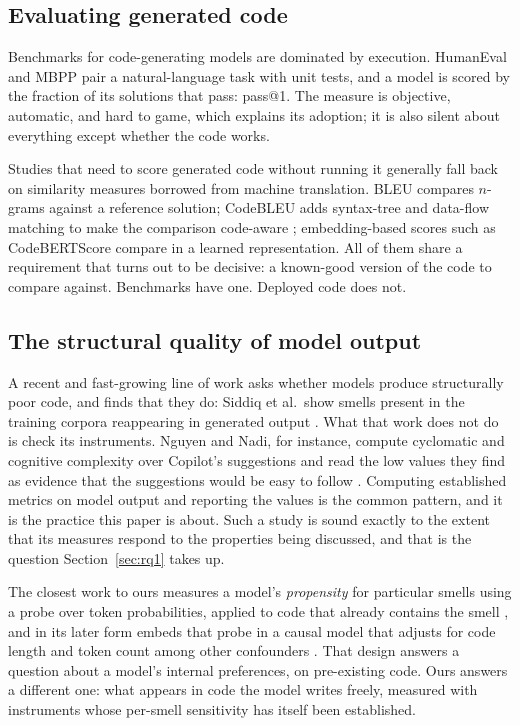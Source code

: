 \documentclass[10pt,a4paper,twocolumn]{article}
\begin{document}
\subsection{Evaluating generated code}

Benchmarks for code-generating models are dominated by execution. HumanEval
\cite{humaneval2021} and MBPP \cite{mbpp2021} pair a natural-language task with
unit tests, and a model is scored by the fraction of its solutions that pass:
pass@1. The measure is objective, automatic, and hard to game, which explains its
adoption; it is also silent about everything except whether the code works.

Studies that need to score generated code without running it generally fall back
on similarity measures borrowed from machine translation. BLEU compares
$n$-grams against a reference solution; CodeBLEU adds syntax-tree and data-flow
matching to make the comparison code-aware \cite{codebleu2020}; embedding-based
scores such as CodeBERTScore compare in a learned representation. All of them
share a requirement that turns out to be decisive: a known-good version of the
code to compare against. Benchmarks have one. Deployed code does not.

\subsection{The structural quality of model output}

A recent and fast-growing line of work asks whether models produce structurally
poor code, and finds that they do: Siddiq et al.\ show smells present in the
training corpora reappearing in generated output \cite{siddiq2022empirical}. What
that work does not do is check its instruments. Nguyen and Nadi, for instance,
compute cyclomatic and cognitive complexity over Copilot's suggestions and read
the low values they find as evidence that the suggestions would be easy to
follow \cite{nguyen2022empirical}. Computing established metrics on model output
and reporting the values is the common pattern, and it is the practice this
paper is about. Such a study is sound exactly to the extent that its measures
respond to the properties being discussed, and that is the question
Section~\ref{sec:rq1} takes up.

The closest work to ours measures a model's \emph{propensity} for particular
smells using a probe over token probabilities, applied to code that already
contains the smell \cite{velasco2024propense}, and in its later form embeds that
probe in a causal model that adjusts for code length and token count among other
confounders \cite{velasco2025causal}. That design answers a question about a
model's internal preferences, on pre-existing code. Ours answers a different one:
what appears in code the model writes freely, measured with instruments whose
per-smell sensitivity has itself been established.
\end{document}
